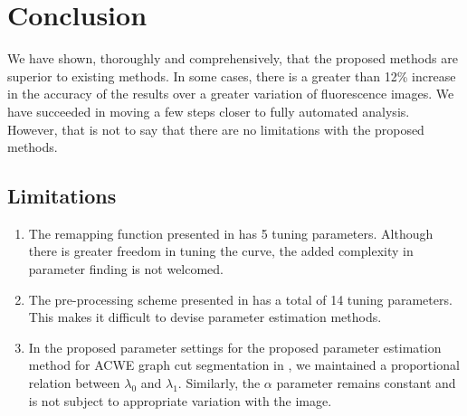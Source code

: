 
\chapter{Conclusion} %

\label{chap:Chapter7} %

We have shown, thoroughly and comprehensively, that the proposed methods are superior to existing methods. In some cases, there is a greater than 12\% increase in the accuracy of the results over a greater variation of fluorescence images. We have succeeded in moving a few steps closer to fully automated analysis. However, that is not to say that there are no limitations with the proposed methods.

\section{Limitations}

\begin{enumerate}
	\item The remapping function presented in  has 5 tuning parameters. Although there is greater freedom in tuning the curve, the added complexity in parameter finding is not welcomed.
	
	\item The pre-processing scheme presented in  has a total of 14 tuning parameters. This makes it difficult to devise parameter estimation methods.
	
	\item In the proposed parameter settings for the proposed parameter estimation method for ACWE graph cut segmentation in , we maintained a proportional relation between $\lambda_0$ and $\lambda_1$. Similarly, the $\alpha$ parameter remains constant and is not subject to appropriate variation with the image. 
\end{enumerate}

